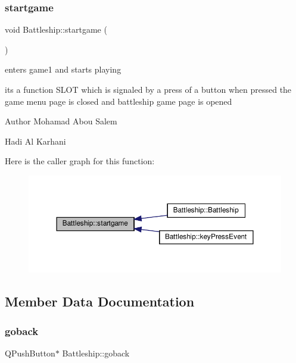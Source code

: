 \subsubsection{\texorpdfstring{startgame}{startgame}}
{\footnotesize\ttfamily void Battleship\+::startgame (\begin{DoxyParamCaption}{ }\end{DoxyParamCaption})\hspace{0.3cm}{\ttfamily [slot]}}



enters game1 and starts playing 

its a function S\+L\+OT which is signaled by a press of a button when pressed the game menu page is closed and battleship game page is opened

\begin{DoxyAuthor}{Author}
Mohamad Abou Salem 

Hadi Al Karhani 
\end{DoxyAuthor}
Here is the caller graph for this function\+:
\nopagebreak
\begin{figure}[H]
\begin{center}
\leavevmode
\includegraphics[width=350pt]{classBattleship_abd2c4b47572e707f91e5fef6790a48a5_icgraph}
\end{center}
\end{figure}


\subsection{Member Data Documentation}
\mbox{\label{classBattleship_a4480babf26efe4e44c6255b17021611f}} 
\subsubsection{\texorpdfstring{goback}{goback}}
{\footnotesize\ttfamily Q\+Push\+Button$\ast$ Battleship\+::goback\hspace{0.3cm}{\ttfamily [private]}}

